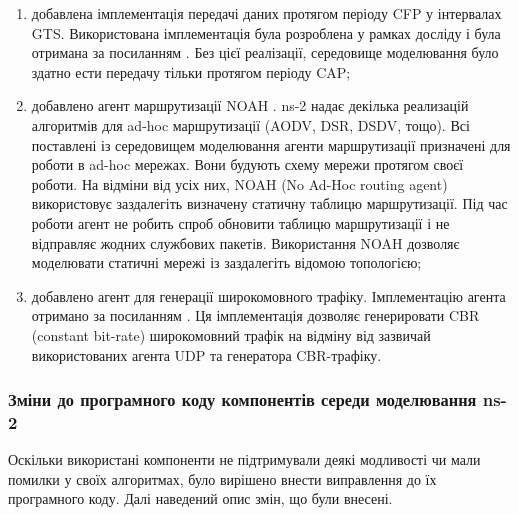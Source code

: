 \documentclass[a4paper,ukrainian,utf8,nocolumnsxix,floatsection,equationsection]{eskdtext}
\renewcommand\paragraph{\subsubsection}
\begin{document}
\begin{enumerate}
	\item добавлена імплементація передачі даних протягом періоду CFP у інтервалах GTS. Використована імплементація була розроблена у рамках досліду \cite{ns2:with:cfp} і була отримана за посиланням \cite{ns2:with:cfp:sources}. Без цієї реалізації, середовище моделювання було здатно ести передачу тільки протягом періоду CAP;

	\item добавлено агент маршрутизації NOAH \cite{ns2:noah}. ns-2 надає декілька реализацій алгоритмів для ad-hoc маршрутизації (AODV, DSR, DSDV, тощо). Всі поставлені із середовищем моделювання агенти маршрутизації призначені для роботи в ad-hoc мережах. Вони будують схему мережи протягом своєї роботи. На відміни від усіх них, NOAH (No Ad-Hoc routing agent) використовує заздалегіть визначену статичну таблицю маршрутизації. Під час роботи агент не робить спроб обновити таблицю маршрутизації і не відправляє жодних службових пакетів. Використання NOAH дозволяє моделювати статичні мережі із заздалегіть відомою топологією;

	\item добавлено агент для генерації широкомовного трафіку. Імплементацію агента отримано за посиланням \cite{ns2:broadcastapp}. Ця імплементація дозволяє генерировати CBR (constant bit-rate) широкомовний трафік на відміну від зазвичай використованих агента UDP та генератора CBR-трафіку.

\end{enumerate}

\paragraph{Зміни до програмного коду компонентів середи моделювання ns-2}

Оскільки використані компоненти не підтримували деякі модливості чи мали помилки у своїх алгоритмах, було вирішено внести виправлення до їх програмного коду. Далі наведений опис змін, що були внесені. 
\end{document}
